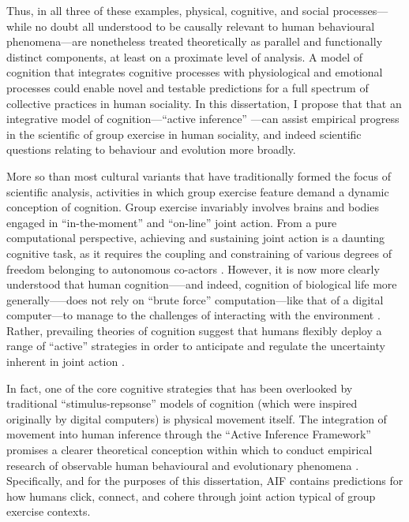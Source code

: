 \begin{CJK}{UTF8}{gbsn}
Thus, in all three of these examples, physical, cognitive, and social processes---while no doubt all understood to be causally relevant to human behavioural phenomena---are nonetheless treated theoretically as parallel and functionally distinct components, at least on a proximate level of analysis.  A model of cognition that integrates cognitive processes with physiological and emotional processes could enable novel and testable predictions for a full spectrum of collective practices in human sociality. In this dissertation, I propose that that an integrative model of cognition---``active inference'' \citep{Friston2010}---can assist empirical progress in the scientific of group exercise in human sociality, and indeed scientific questions relating to behaviour and evolution more broadly.

More so than most cultural variants that have traditionally formed the focus of scientific analysis, activities in which group exercise feature demand a dynamic conception of cognition.  Group exercise invariably involves brains and bodies engaged in ``in-the-moment'' and ``on-line'' joint action.  From a pure computational perspective, achieving and sustaining joint action is a daunting cognitive task, as it requires the coupling and constraining of various degrees of freedom belonging to autonomous co-actors \citep{Bernstein1967,Turvey1978}.  However, it is now more clearly understood that human cognition—--and indeed, cognition of biological life more generally—--does not rely on ``brute force'' computation---like that of a digital computer---to manage to the challenges of interacting with the environment \citep{Yufik2013}.  Rather, prevailing theories of cognition suggest that humans flexibly deploy a range of ``active'' strategies in order to anticipate and regulate the uncertainty inherent in joint action \citep{Clark2015}.

In fact, one of the core cognitive strategies that has been overlooked by traditional ``stimulus-repsonse'' models of cognition (which were inspired originally by digital computers) is physical movement itself.  The integration of movement into human inference through the ``Active Inference Framework'' \citep[hereafter AIF cf.][]{Friston2010} promises a clearer theoretical conception within which to conduct empirical research of observable human behavioural and evolutionary phenomena \citep{Clark2015,Linson2018}.  Specifically, and for the purposes of this dissertation, AIF contains predictions for how humans click, connect, and cohere through joint action typical of group exercise contexts.


\end{CJK}
